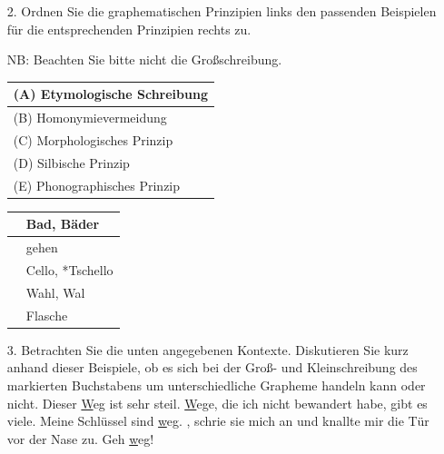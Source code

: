 \begin{frame}
	\begin{itemize}
		\item[2.] Ordnen Sie die graphematischen Prinzipien links den passenden Beispielen für die entsprechenden Prinzipien rechts zu.
		
		NB: Beachten Sie bitte nicht die Großschreibung.
		
		\vspace{.5cm}
								
		\begin{minipage}{0.45\textwidth}
			\centering
			\begin{tabular}{|l|}
				\hline
				(A) Etymologische Schreibung\\
				\hline
				(B) Homonymievermeidung\\
				\hline
				(C) Morphologisches Prinzip\\
				\hline
				(D) Silbische Prinzip\\
				\hline
				(E) Phonographisches Prinzip\\
				\hline
			\end{tabular}
		\end{minipage}
		\hfill%
		\begin{minipage}{0.45\textwidth}
			\centering
			\begin{tabular}{|p{}|l|}
				\hline
				& Bad, Bäder \\
				\hline
				& gehen \\
				\hline
				& Cello, *Tschello \\
				\hline
				& Wahl, Wal\\
				\hline
				& Flasche \\
				\hline
			\end{tabular}
		\end{minipage}

	\end{itemize}
\end{frame}


\begin{frame}
	\begin{itemize}
		\item[3.] Betrachten Sie die unten angegebenen Kontexte. Diskutieren Sie kurz anhand dieser Beispiele, ob es sich bei der Groß- und Kleinschreibung des markierten Buchstabens um unterschiedliche Grapheme handeln kann oder nicht.
\eal\label{ex:04aHA3}
			\ex Dieser \underline{W}eg ist sehr steil.
			\ex \underline{W}ege, die ich nicht bewandert habe, gibt es viele.
			\ex Meine Schlüssel sind \underline{w}eg.
			\ex {}, schrie sie mich an und knallte mir die Tür vor der Nase zu.
			\ex Geh \underline{w}eg!
\zl
	\end{itemize}
\end{frame}


